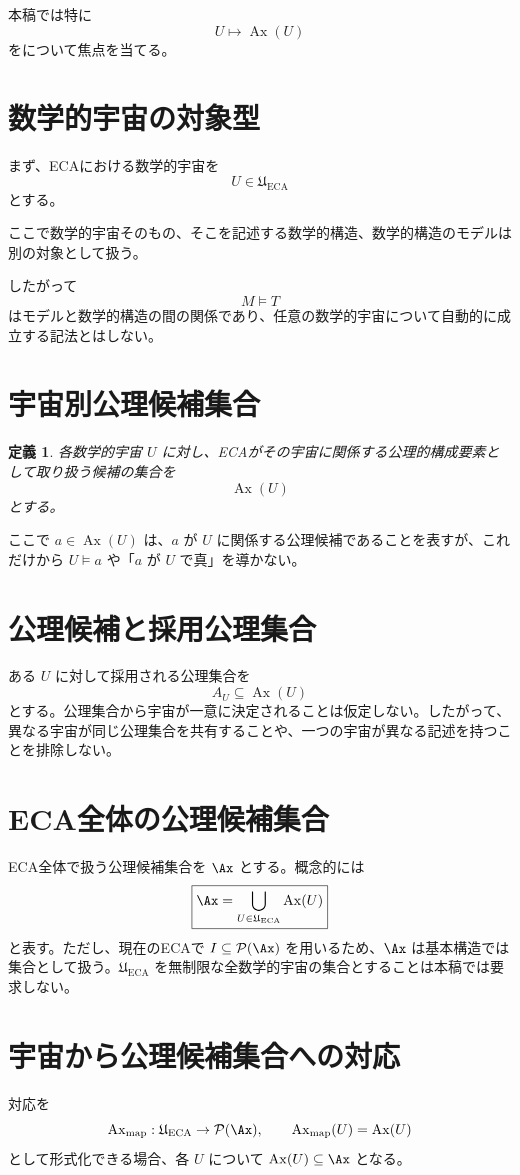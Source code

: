 \documentclass[11pt,a4paper]{article}
\newtheorem{definition}{定義}
\begin{document}
本稿では特に
\[
U\longmapsto\operatorname{Ax}(U)
\]
をについて焦点を当てる。

\section{数学的宇宙の対象型}
まず、ECAにおける数学的宇宙を
\[
U\in\mathfrak{U}_{\mathrm{ECA}}
\]
とする。

ここで数学的宇宙そのもの、そこを記述する数学的構造、数学的構造のモデルは別の対象として扱う。

したがって
\[
M\models T
\]
はモデルと数学的構造の間の関係であり、任意の数学的宇宙について自動的に成立する記法とはしない。

\section{宇宙別公理候補集合}
\begin{definition}
各数学的宇宙 $U$ に対し、ECAがその宇宙に関係する公理的構成要素として取り扱う候補の集合を
\[
\operatorname{Ax}(U)
\]
とする。
\end{definition}

ここで $a\in\operatorname{Ax}(U)$ は、$a$ が $U$ に関係する公理候補であることを表すが、これだけから $U\models a$ や「$a$ が $U$ で真」を導かない。

\section{公理候補と採用公理集合}
ある $U$ に対して採用される公理集合を
\[
A_U\subseteq\operatorname{Ax}(U)
\]
とする。公理集合から宇宙が一意に決定されることは仮定しない。したがって、異なる宇宙が同じ公理集合を共有することや、一つの宇宙が異なる記述を持つことを排除しない。

\section{ECA全体の公理候補集合}
ECA全体で扱う公理候補集合を $\Ax$ とする。概念的には
\[
\boxed{\Ax=\bigcup_{U\in\mathfrak{U}_{\mathrm{ECA}}}\operatorname{Ax}(U)}
\]
と表す。ただし、現在のECAで $I\subseteq\mathcal{P}(\Ax)$ を用いるため、$\Ax$ は基本構造では集合として扱う。$\mathfrak{U}_{\mathrm{ECA}}$ を無制限な全数学的宇宙の集合とすることは本稿では要求しない。

\section{宇宙から公理候補集合への対応}
対応を
\[
\operatorname{Ax}_{\mathrm{map}}:\mathfrak{U}_{\mathrm{ECA}}\to\mathcal{P}(\Ax),
\qquad
\operatorname{Ax}_{\mathrm{map}}(U)=\operatorname{Ax}(U)
\]
として形式化できる場合、各 $U$ について $\operatorname{Ax}(U)\subseteq\Ax$ となる。
\end{document}
